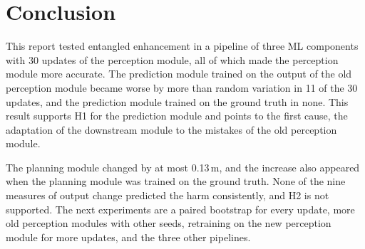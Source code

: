 \documentclass[11pt,a4paper]{article}
\begin{document}
\section{Conclusion}

This report tested entangled enhancement in a pipeline of three ML components
with 30 updates of the perception module, all of which made the perception
module more accurate. The prediction module trained on the output of the old
perception module became worse by more than random variation in 11 of the 30
updates, and the prediction module trained on the ground truth in none. This
result supports H1 for the prediction module and points to the first cause,
the adaptation of the downstream module to the mistakes of the old perception
module.

The planning module changed by at most 0.13\,m, and the increase also appeared
when the planning module was trained on the ground truth. None of the nine
measures of output change predicted the harm consistently, and H2 is not
supported. The next experiments are a paired bootstrap for every update, more
old perception modules with other seeds, retraining on the new perception
module for more updates, and the three other pipelines.

\FloatBarrier


\end{document}
